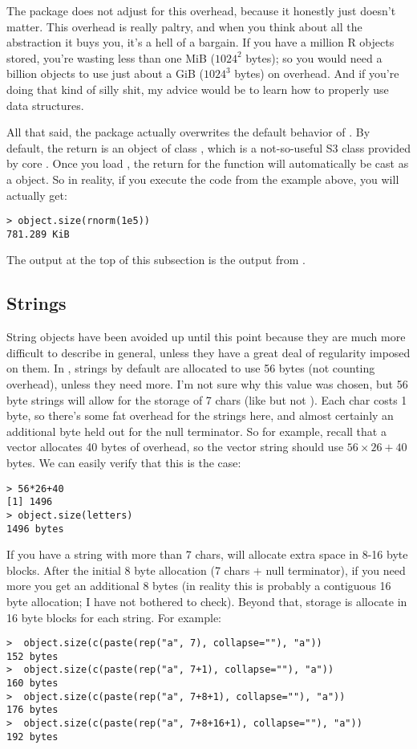 The  package does not adjust for this overhead, because it 
honestly just doesn't matter.  This overhead is really paltry, and when you 
think about all the abstraction it buys you, it's a hell of a bargain.  If you 
have a million R objects stored, you're wasting less than one MiB ($1024^2$ 
bytes); so you would need a billion objects to use just about a GiB ($1024^3$ 
bytes) on overhead.  And if you're doing that kind of silly shit, my advice 
would be to learn how to properly use data structures.

All that said, the  package actually overwrites the default 
behavior of .  By default, the return is an object of class 
, which is a not-so-useful S3 class provided by core 
.  Once you load , the return for the 
 function will automatically be cast as a  
object.  So in reality, if you execute the code from the example above, you 
will actually get:
\begin{lstlisting}[language=rr]
> object.size(rnorm(1e5))
781.289 KiB
\end{lstlisting}
The output at the top of this subsection is the output from 
.


\subsection{Strings}

String objects have been avoided up until this point because they are much more 
difficult to describe in general, unless they have a great deal of regularity 
imposed on them.  In , strings by default are allocated to use 56 
bytes (not counting overhead), unless they need more.  I'm not sure why this 
value was chosen, but 56 byte strings will allow for the storage of 7 chars 
(like  but not ).  Each char costs 1 byte, so there's some fat 
overhead for the strings here, and almost certainly an additional byte held out 
for the null terminator.  So for example, recall that a vector allocates 40 
bytes of overhead, so the vector string  should use $56\times 26 + 
40$ bytes.  We can easily verify that this is the case:
\begin{lstlisting}[language=rr]
> 56*26+40
[1] 1496
> object.size(letters)
1496 bytes
\end{lstlisting}

If you have a string with more than 7 chars,  will allocate extra 
space in 8-16 byte blocks.  After the initial 8 byte allocation (7 chars $+$ 
null terminator), if you need more you get an additional 8 bytes (in reality 
this is probably a contiguous 16 byte allocation; I have not bothered to check). 
 Beyond that, storage is allocate in 16 byte blocks for each string.  For 
example:
\begin{lstlisting}[language=rr]
>  object.size(c(paste(rep("a", 7), collapse=""), "a")) 
152 bytes
>  object.size(c(paste(rep("a", 7+1), collapse=""), "a")) 
160 bytes
>  object.size(c(paste(rep("a", 7+8+1), collapse=""), "a")) 
176 bytes
>  object.size(c(paste(rep("a", 7+8+16+1), collapse=""), "a")) 
192 bytes
\end{lstlisting}

